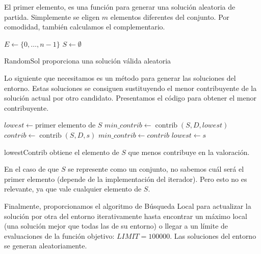 \documentclass{article}
\begin{document}
El primer elemento, es una función para generar una solución aleatoria de partida. Simplemente se eligen $m$ elementos 
diferentes del conjunto. Por comodidad, también calculamos el complementario.

\begin{algorithm}[H]
	\DontPrintSemicolon %
	$E \gets \{0,\ldots, n-1\}$ 
	$S \gets \emptyset$ 
	\;
	 
	\caption{{\sc RandomSol} proporciona una solución válida aleatoria}
	\label{alg:randomsol}
\end{algorithm}

Lo siguiente que necesitamos es un método para generar las soluciones del entorno. Estas soluciones se consiguen sustituyendo
el menor contribuyente de la solución actual por otro candidato. Presentamos el código para obtener el menor contribuyente.

\begin{algorithm}[H]
	\DontPrintSemicolon %
	$lowest \gets \text{primer elemento de } S$\;
	$min\_contrib \gets \operatorname{contrib}(S,D,lowest)$\;
	 {
		$contrib \gets \operatorname{contrib}(S,D,s)$\;
		 { 
			$min\_contrib \gets contrib$\;
			$lowest \gets s$ 
		}
	}
	\;
	\;
	\caption{{\sc lowestContrib} obtiene el elemento de $S$ que menos contribuye en la valoración.}
	\label{alg:lowest-contributor}
\end{algorithm}

En el caso de que $S$ se represente como un conjunto, no sabemos cuál será el primer elemento (depende de la implementación del iterador). Pero
esto no es relevante, ya que vale cualquier elemento de $S$.

Finalmente, proporcionamos el algoritmo de Búsqueda Local para actualizar la solución por otra del entorno iterativamente
hasta encontrar un máximo local (una solución mejor que todas las de su entorno) o llegar a un límite de evaluaciones de la función
objetivo: $LIMIT=100000$. Las soluciones del entorno se generan aleatoriamente.
\end{document}
